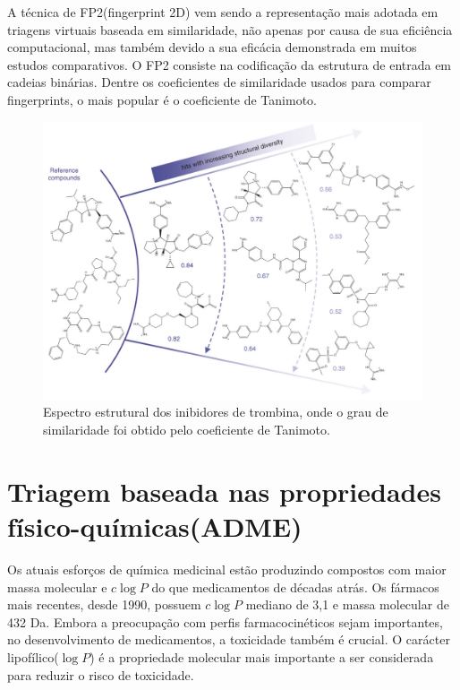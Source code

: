 A técnica de FP2(fingerprint 2D) vem sendo a representação mais adotada em triagens virtuais baseada em similaridade, não apenas por causa de sua eficiência computacional, mas também devido a sua eficácia demonstrada em muitos estudos comparativos. O FP2 consiste na codificação da estrutura de entrada em cadeias binárias. Dentre os coeficientes de similaridade usados para comparar fingerprints, o mais popular é o coeficiente de Tanimoto. \cite{Willett2006}
 
\begin{figure}[H]
\centering
\includegraphics[scale=1.2]{Figuras/vs_diversity.png}
\caption{Espectro estrutural dos inibidores de trombina, onde o grau de similaridade foi obtido pelo coeficiente de Tanimoto. \cite{Eckert2007}}
\end{figure}

\section{Triagem baseada nas propriedades físico-químicas(ADME)}

Os atuais esforços de química medicinal estão produzindo compostos com maior massa molecular e $c \log P$ do que medicamentos de décadas atrás. Os fármacos mais recentes, desde 1990, possuem $c \log P$ mediano de 3,1 e massa molecular de 432 Da. Embora a preocupação com perfis farmacocinéticos sejam importantes, no desenvolvimento de medicamentos, a toxicidade também é crucial. O carácter lipofílico($\log P$) é a propriedade molecular mais importante a ser considerada para reduzir o risco de toxicidade. \cite{Leeson2007}

